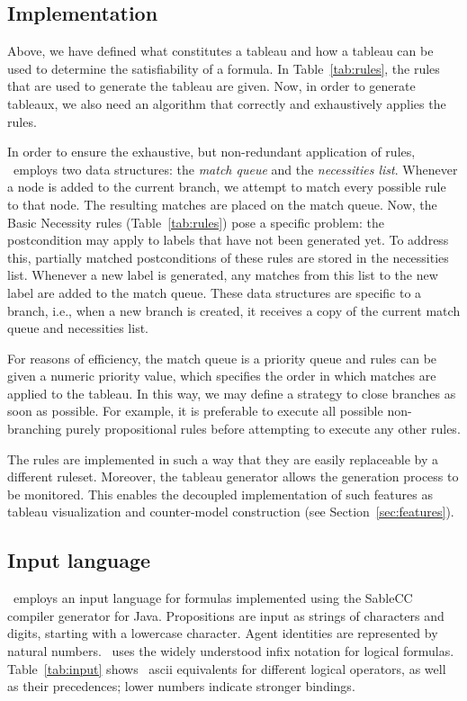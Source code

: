 \subsection{Implementation}
\label{sec:implementation}

Above, we have defined what constitutes a tableau and how a tableau can be used
to determine the satisfiability of a formula. In Table~\ref{tab:rules}, the
rules that are used to generate the tableau are given. Now, in order to
generate tableaux, we also need an algorithm that correctly and exhaustively
applies the rules.

In order to ensure the exhaustive, but non-redundant application of rules,
\oops\ employs two data structures: the {\em match queue} and the {\em
necessities list}.
Whenever a node is added to the current branch, we attempt to match every
possible
rule to that node. The resulting matches are placed on the match queue. Now,
the Basic Necessity rules (Table~\ref{tab:rules}) pose a specific problem:
the postcondition may apply to labels that have not been generated yet. To
address this, partially matched postconditions of these rules are stored in
the necessities list. Whenever a new label is generated, any matches from this
list to the new label are added to the match queue.
These data structures are specific to a branch, i.e., when
a new branch is created, it receives a copy of the current match queue and
necessities list.

For reasons of efficiency,
the match queue is a priority queue and rules can be given a numeric
priority value, which specifies the order in which matches are applied to the
tableau. In this way, we may define a strategy to close branches as soon as
possible. For example, it is preferable to execute all possible non-branching
purely propositional rules before attempting to execute any other rules.

The rules are implemented in such a way that they are easily replaceable by a
different ruleset.
Moreover, the tableau generator allows the generation process to be monitored.
This enables the decoupled implementation of such features as tableau
visualization and counter-model construction (see Section~\ref{sec:features}).

\subsection{Input language}
\label{sec:language}

\oops\ employs an input language for formulas implemented using the SableCC
\citep{gagnon1998} compiler generator for Java. Propositions are input as
strings of characters and digits, starting with a lowercase character.  Agent
identities are represented by natural numbers. \oops\ uses the widely
understood infix notation for logical formulas. Table~\ref{tab:input} shows \oops\ ascii equivalents for different logical operators, as well as their precedences; lower numbers indicate stronger bindings.

